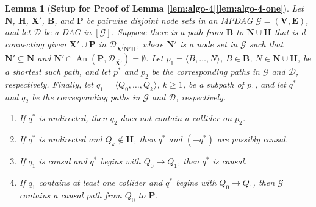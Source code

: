 \documentclass[11pt]{article}
\DeclareMathOperator{\An}{An}
\newtheorem{lemma}[theorem]{Lemma}
\newcommand{\mb}[1]{\mathbf{#1}}
\newcommand{\g}[1][G]{\mathcal{#1}}
\begin{document}
\begin{lemma}[\textbf{Setup for Proof of Lemma \ref{lem:algo-4}\ref{lem:algo-4-one}}]
\label{lem:algo-4abcd}
    Let $\mb{N}$, $\mb{H}$, $\mb{X'}$, $\mb{B}$, and $\mb{P}$ be pairwise disjoint node sets in an MPDAG $\g =(\mb{V,E})$, and let $\g[D]$ be a DAG in $[\g]$. Suppose there is a path from $\mb{B}$ to $\mb{N} \cup \mb{H}$ that is d-connecting given $\mb{X'} \cup \mb{P}$ in $\g[D]_{\overline{\mb{X'}\mb{N'}}\underline{\mb{H}}}$, where $\mb{N'}$ is a node set in $\g$ such that $\mb{N'} \subseteq \mb{N}$ and $\mb{N'} \cap \An(\mb{P},\g[D]_{\overline{\mb{X'}}}) = \emptyset$. Let $p_1 =\langle B, \dots, N \rangle$, $B \in \mb{B}$, $N \in \mb{N} \cup \mb{H}$, be a shortest such path, and let $p^*$ and $p_2$ be the corresponding paths in $\g$ and $\g[D]$, respectively. Finally, let $q_1 = \langle Q_0, \dots, Q_k \rangle$, $k \ge 1$, be a subpath of $p_1$, and let $q^*$ and $q_2$ be the corresponding paths in $\g$ and $\g[D]$, respectively.
    \begin{enumerate}[label=(\roman*)]
        \item \label{lem:algo-4a} 
        If $q^*$ is undirected, then $q_2$ does not contain a collider on $p_2$.

        \item \label{lem:algo-4b} 
        If $q^*$ is undirected and $Q_k \notin \mb{H}$, then $q^*$ and $(-q^*)$ are possibly causal.

        \item \label{lem:algo-4c} 
        If $q_1$ is causal and $q^*$ begins with $Q_0 \to Q_1$, then $q^*$ is causal.

        \item \label{lem:algo-4d} 
        If $q_1$ contains at least one collider and $q^*$ begins with $Q_0 \to Q_1$, then $\g$ contains a causal path from $Q_0$ to $\mb{P}$.
    \end{enumerate}
\end{lemma}
\end{document}
